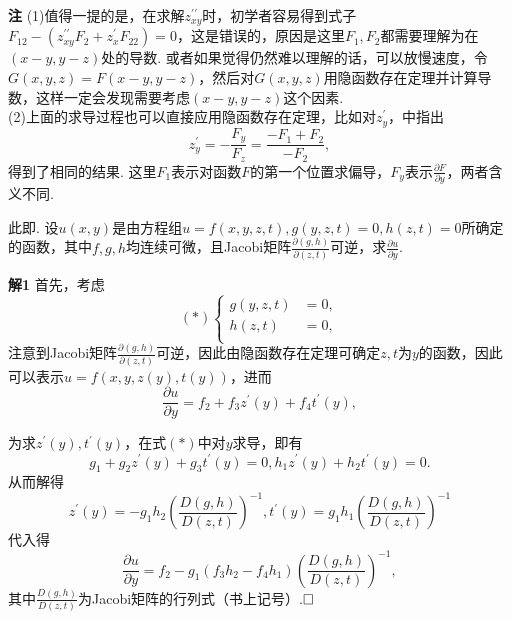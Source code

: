 \documentclass{ctexart}
\newenvironment{custom}[1]{\par\noindent \textbf{#1}\quad}{\par\vspace{1em}}
\begin{document}
\begin{custom}{注}
(1)值得一提的是，在求解$z^{\prime\prime}_{xy}$时，初学者容易得到式子$F_{12}-(z^{\prime\prime}_{xy}F_{2}+z^{\prime}_{x}F_{22})=0$，这是错误的，原因是这里$F_{1},F_{2}$都需要理解为在$(x-y,y-z)$处的导数. 或者如果觉得仍然难以理解的话，可以放慢速度，令$G(x,y,z)=F(x-y,y-z)$，然后对$G(x,y,z)$用隐函数存在定理并计算导数，这样一定会发现需要考虑$(x-y,y-z)$这个因素.\\
(2)上面的求导过程也可以直接应用隐函数存在定理，比如对$z^{\prime}_{y}$，\cite{XHM}中指出
$$z^{\prime}_{y}=-\frac{F_{y}}{F_{z}}=\frac{-F_{1}+F_{2}}{-F_{2}},$$
得到了相同的结果. 这里$F_{1}$表示对函数$F$的第一个位置求偏导，$F_{y}$表示$\frac{\partial F}{\partial y}$，两者含义不同.
\end{custom}


\begin{example}
此即\cite[例题20.2.2]{XHM}. 设$u(x,y)$是由方程组$u=f(x,y,z,t),g(y,z,t)=0,h(z,t)=0$所确定的函数，其中$f,g,h$均连续可微，且Jacobi矩阵$\frac{\partial (g,h)}{\partial(z,t)}$可逆，求$\frac{\partial u}{\partial y}$.
\end{example}

\begin{custom}{解1}
首先，考虑
$$(*)\left\{\begin{aligned}g(y,z,t)&=0,\\h(z,t)&=0,\\\end{aligned}\right.$$
注意到Jacobi矩阵$\frac{\partial (g,h)}{\partial(z,t)}$可逆，因此由隐函数存在定理可确定$z,t$为$y$的函数，因此可以表示$u=f(x,y,z(y),t(y))$，进而
$$\frac{\partial u}{\partial y}=f_{2}+f_{3}z^{\prime}(y)+f_{4}t^{\prime}(y),$$

为求$z^{\prime}(y),t^{\prime}(y)$，在式$(*)$中对$y$求导，即有
$$g_{1}+g_{2}z^{\prime}(y)+g_{3}t^{\prime}(y)=0,h_{1}z^{\prime}(y)+h_{2}t^{\prime}(y)=0.$$
从而解得
$$z^{\prime}(y)=-g_{1}h_{2}\left(\frac{D(g,h)}{D(z,t)}\right)^{-1},t^{\prime}(y)=g_{1}h_{1}\left(\frac{D(g,h)}{D(z,t)}\right)^{-1}$$
代入得
$$\frac{\partial u}{\partial y}=f_{2}-g_{1}(f_{3}h_{2}-f_{4}h_{1})\left(\frac{D(g,h)}{D(z,t)}\right)^{-1},$$
其中$\frac{D(g,h)}{D(z,t)}$为Jacobi矩阵的行列式（书上记号）.$\hfill{\square}$
\end{custom}
\end{document}
